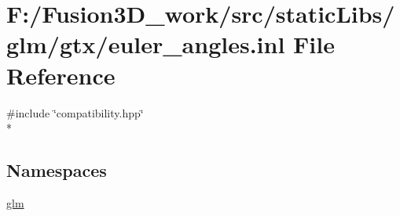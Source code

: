 \hypertarget{euler__angles_8inl}{}\section{F\+:/\+Fusion3\+D\+\_\+work/src/static\+Libs/glm/gtx/euler\+\_\+angles.inl File Reference}
\label{euler__angles_8inl}
{\ttfamily \#include \char`\"{}compatibility.\+hpp\char`\"{}}\\*
\subsection*{Namespaces}
\begin{DoxyCompactItemize}
\item 
 \hyperlink{namespaceglm}{glm}
\end{DoxyCompactItemize}
